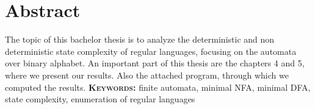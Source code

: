 \chapter{Abstract}
The topic of this bachelor thesis is to analyze the deterministic and non deterministic state complexity of regular languages, focusing on the automata over binary alphabet. An important part of this thesis are the chapters 4 and 5, where we present our results. Also the attached program, through which we computed the results.
\textbf{\textsc{Keywords:}} finite automata, minimal NFA, minimal DFA, state complexity, enumeration of regular languages

